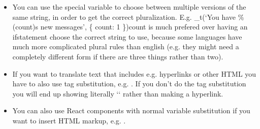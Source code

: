 \documentclass[letterpaper,10pt,openany,oneside,english]{sphinxmanual}
\begin{document}
\begin{itemize}
\item {} 
\sphinxAtStartPar
You can use the special  variable to choose between multiple versions of the same string, in order to get the correct pluralization. E.g. \_t(‘You have \%(count)s new messages’, \{ count: 1 \})count\textasciigrave{}\textasciigrave{} is much prefered over having an if\sphinxhyphen{}statement choose the correct string to use, because some languages have much more complicated plural rules than english (e.g. they might need a completely different form if there are three things rather than two).

\item {} 
\sphinxAtStartPar
If you want to translate text that includes e.g. hyperlinks or other HTML you have to also use tag substitution, e.g. . If you don’t do the tag substitution you will end up showing literally ‘‘ rather than making a hyperlink.

\item {} 
\sphinxAtStartPar
You can also use React components with normal variable substitution if you want to insert HTML markup, e.g. .

\end{itemize}
\end{document}
